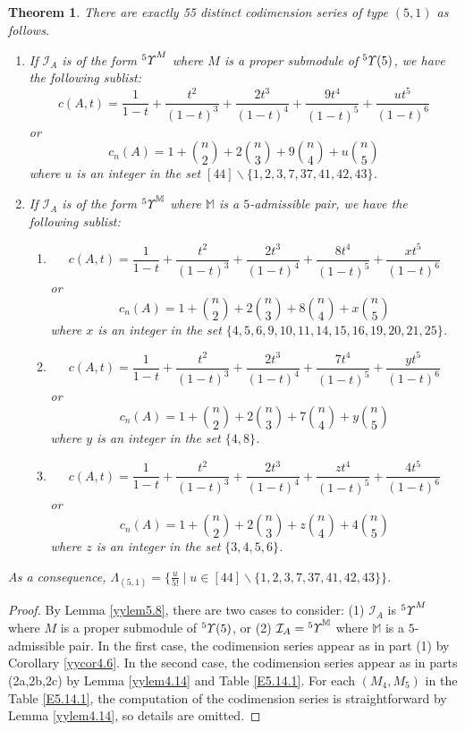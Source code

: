 \documentclass{amsart}
\newtheorem{thm}{Theorem}[section]
\theoremstyle{definition}
\theoremstyle{remark}
\numberwithin{equation}{section}
\newcommand{\up}[1]{{^{#1}{\it \!\Upsilon}}}
\newcommand{\upa}[1]{{^{#1}{\it \!\Upsilon}}}
\def \I{\mathcal{I}}
\begin{document}
\begin{thm}
\label{yythm5.15}
There are exactly 55 distinct codimension series of type 
$(5,1)$ as follows.
\begin{enumerate}
\item[(1)]
If $\I_A$ is of the form $\up{5}^{M}$ where $M$ is a proper 
submodule of $\up{5}(5)$, we have the following sublist:
$$c(A,t)=\frac{1}{1-t}+\frac{t^2}{(1-t)^3}+\frac{2t^3}{(1-t)^4}
+\frac{9t^4}{(1-t)^5}+\frac{ut^5}{(1-t)^6}$$
or
\[c_n(A)= 1+{n\choose 2}+2{n\choose 3}+9{n\choose 4}+u{n\choose 5}\]
where $u$ is an integer in the set 
$[44] \backslash \{1,2,3,7,37,41,42,43\}$.
\item[(2)]
If $\I_A$ is of the form $\up{5}^{\mathbb M}$ where ${\mathbb M}$ 
is a $5$-admissible pair, we have the following sublist:
\begin{enumerate}
\item[(2a)]
$$c(A,t)=\frac{1}{1-t}+\frac{t^2}{(1-t)^3}+
\frac{2t^3}{(1-t)^4}+\frac{8t^4}{(1-t)^5}+\frac{xt^5}{(1-t)^6}$$
or
\[c_n(A)= 1+{n\choose 2}+2{n\choose 3}+8{n\choose 4}+x{n\choose 5}\]
where $x$ is an integer in the set 
$\{ 4,5,6,9,10,11,14,15,16,19,20,21,25 \}$.
\item[(2b)]
$$c(A,t)=\frac{1}{1-t}+\frac{t^2}{(1-t)^3}+\frac{2t^3}{(1-t)^4}
+\frac{7t^4}{(1-t)^5}+\frac{yt^5}{(1-t)^6}$$
or
\[c_n(A)= 1+{n\choose 2}+2{n\choose 3}+7{n\choose 4}+y{n\choose 5}\]
where $y$ is an integer in the set $\{ 4,8 \}$.
\item[(2c)]
$$c(A,t)=\frac{1}{1-t}+\frac{t^2}{(1-t)^3}+\frac{2t^3}{(1-t)^4}
+\frac{zt^4}{(1-t)^5}+\frac{4t^5}{(1-t)^6}$$
or
\[c_n(A)= 1+{n\choose 2}+2{n\choose 3}+z{n\choose 4}+4{n\choose 5}\]
where $z$ is an integer in the set $\{ 3,4,5,6 \}$.
\end{enumerate}
\end{enumerate}
As a consequence, 
$\Lambda_{(5,1)}=\{\frac{u}{5!}\mid  u\in [44] 
\backslash \{1,2,3,7,37,41,42,43\}\}$.
\end{thm}


\begin{proof} By Lemma \ref{yylem5.8}, there
are two cases to consider: (1) $\I_A$ is $\up{5}^M$ 
where $M$ is a proper submodule of $\up{5}(5)$, or
(2) $\I_A=\upa{5}^{\mathbb M}$ where ${\mathbb M}$ is 
a $5$-admissible pair. In the first case, the 
codimension series appear as in part (1) by
Corollary \ref{yycor4.6}. In the second case,
the codimension series appear as in parts (2a,2b,2c)
by Lemma \ref{yylem4.14} and Table \eqref{E5.14.1}.
For each $(M_4,M_5)$ in the Table \eqref{E5.14.1},
the computation of the codimension series is 
straightforward by Lemma \ref{yylem4.14}, so 
details are omitted. 
\end{proof}
\end{document}
